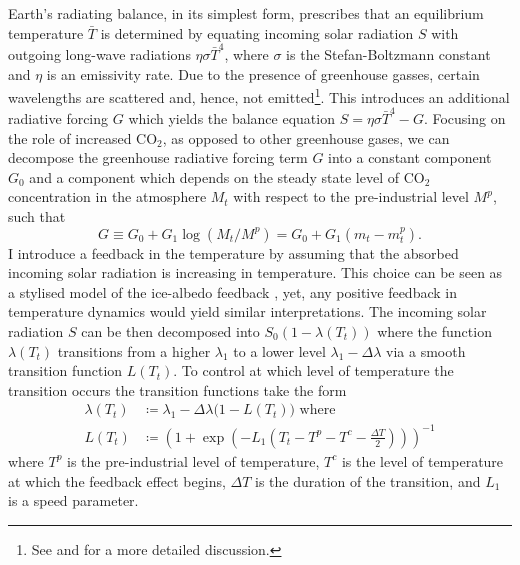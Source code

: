 \documentclass[../../main.tex]{subfiles}
\begin{document}
Earth's radiating balance, in its simplest form, prescribes that an equilibrium temperature $\bar{T}$ is determined by equating incoming solar radiation $S$ with outgoing long-wave radiations $\eta \sigma \bar{T}^4$, where $\sigma$ is the Stefan-Boltzmann constant and $\eta$ is an emissivity rate. Due to the presence of greenhouse gasses, certain wavelengths are scattered and, hence, not emitted\footnote{See \cite{ghil_topics_2012} and \cite{greiner_economic_2005} for a more detailed discussion.}. This introduces an additional radiative forcing $G$ which yields the balance equation $S = \eta \sigma \bar{T}^4 - G$. Focusing on the role of increased CO$_2$, as opposed to other greenhouse gases, we can decompose the greenhouse radiative forcing term $G$ into a constant component $G_0$ and a component which depends on the steady state level of CO$_2$ concentration in the atmosphere $M_t$ with respect to the pre-industrial level $M^p$, such that \begin{equation}
    G \equiv G_0 + G_1 \log(M_t / M^p) = G_0 + G_1 \left(m_t - m^p_t\right).
\end{equation} I introduce a feedback in the temperature by assuming that the absorbed incoming solar radiation is increasing in temperature. This choice can be seen as a stylised model of the ice-albedo feedback \citep{mcguffie_climate_2005, ashwin_tipping_2012}, yet, any positive feedback in temperature dynamics would yield similar interpretations. 
The incoming solar radiation $S$ can be then decomposed into $S_0 \left(1 - \lambda(T_t)\right)$ where the function $\lambda(T_t)$ transitions from a higher $\lambda_1$ to a lower level $\lambda_1 - \Delta \lambda$ via a smooth transition function $L(T_t)$. To control at which level of temperature the transition occurs the transition functions take the form \begin{subequations} \label{eq:albedo-specification}
    \begin{align}
        \lambda(T_t) &\coloneqq \lambda_1 - \Delta \lambda \big(1 - L(T_t)\big) \text{ where } \label{eq:lambda} \\
        L(T_t) &\coloneqq \left(1 + \exp \left(-L_1 \left(T_t - T^p - T^c - \frac{\Delta T}{2}\right)\right)\right)^{-1}
    \end{align} 
\end{subequations} where $T^p$ is the pre-industrial level of temperature, $T^c$ is the level of temperature at which the feedback effect begins, $\Delta T$ is the duration of the transition, and $L_1$ is a speed parameter. 
\end{document}
